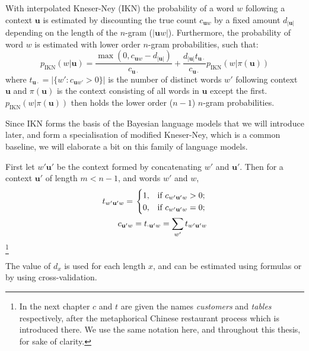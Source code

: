 With interpolated Kneser-Ney (IKN) the probability of a word $w$ following a context $\mathbf{u}$ is estimated by discounting the true count $c_{\mathbf{u}w}$ by a fixed amount $d_{|\mathbf{u}|}$ depending on the length of the $n$-gram ($|\mathbf{u}w|$). Furthermore, the probability of word $w$ is estimated with lower order $n$-gram probabilities, such that:
\begin{equation}
p_{\operatorname{IKN}}(w|\mathbf{u}) = \frac{\max(0, c_{\mathbf{u}w} - d_{|\mathbf{u}|})}{c_{\mathbf{u}\cdot}} + \frac{d_{|\mathbf{u}|}t_{\mathbf{u}\cdot}}{c_{\mathbf{u}\cdot}}p_{\operatorname{IKN}}(w|\pi(\mathbf{u}))
\end{equation}
where $t_{\mathbf{u}\cdot} = |\{ w' : c_{\mathbf{u}w'} > 0 \}|$ is the number of distinct words $w'$ following context $\mathbf{u}$ and $\pi(\mathbf{u})$ is the context consisting of all words in $\mathbf{u}$ except the first. $p_{\operatorname{IKN}}(w|\pi(\mathbf{u}))$ then holds the lower order ($n-1$) $n$-gram probabilities. 

Since IKN forms the basis of the Bayesian language models that we will introduce later, and form a specialisation of modified Kneser-Ney, which is a common baseline, we will elaborate a bit on this family of language models.

First let $w'\mathbf{u'}$ be the context formed by concatenating $w'$ and $\mathbf{u'}$. Then for a context $\mathbf{u'}$ of length $m<n-1$, and words $w'$ and $w$,
\begin{equation}
\begin{split}
t_{w'\mathbf{u'}w} = \left.
\begin{cases}
1, & \textnormal{if } c_{w'\mathbf{u'}w} > 0; \\
0, & \textnormal{if } c_{w'\mathbf{u'}w} = 0;
\end{cases}
\right. \\
c_{\mathbf{u'}w} = t_{\cdot\mathbf{u'}w} = \sum_{w'}t_{w'\mathbf{u'}w}
\end{split}
\end{equation}\footnote{In the next chapter $c$ and $t$ are given the names \emph{customers} and \emph{tables} respectively, after the metaphorical Chinese restaurant process which is introduced there. We use the same notation here, and throughout this thesis, for sake of clarity.}

The value of $d_x$ is used for each length $x$, and can be estimated using formulas or by using cross-validation.

